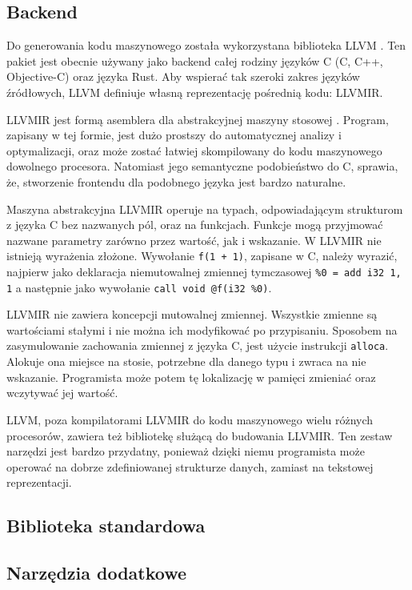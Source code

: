 \subsection{Backend}
\label{implementation:backend}
Do generowania kodu maszynowego została wykorzystana biblioteka LLVM \cite{Lattner:MSThesis02}.
Ten pakiet jest obecnie używany jako backend całej rodziny języków C (C, C++, Objective-C) oraz języka Rust.
Aby wspierać tak szeroki zakres języków źródłowych, LLVM definiuje własną reprezentację pośrednią kodu: LLVMIR.

LLVMIR jest formą asemblera dla abstrakcyjnej maszyny stosowej \cite{llvmir}.
Program, zapisany w tej formie, jest dużo prostszy do automatycznej analizy i optymalizacji, oraz może zostać łatwiej skompilowany do kodu maszynowego dowolnego procesora.
Natomiast jego semantyczne podobieństwo do C, sprawia, że, stworzenie frontendu dla podobnego języka jest bardzo naturalne.

Maszyna abstrakcyjna LLVMIR operuje na typach, odpowiadającym strukturom z języka C bez nazwanych pól, oraz na funkcjach.
Funkcje mogą przyjmować nazwane parametry zarówno przez wartość, jak i wskazanie.
W LLVMIR nie istnieją wyrażenia złożone.
Wywołanie \lstinline{f(1 + 1)}, zapisane w C, należy wyrazić, najpierw jako deklaracja niemutowalnej zmiennej tymczasowej \lstinline{%0 = add i32 1, 1} a następnie jako wywołanie \lstinline{call void @f(i32 %0)}.

LLVMIR nie zawiera koncepcji mutowalnej zmiennej.
Wszystkie zmienne są wartościami stałymi i nie można ich modyfikować po przypisaniu.
Sposobem na zasymulowanie zachowania zmiennej z języka C, jest użycie instrukcji \lstinline{alloca}.
Alokuje ona miejsce na stosie, potrzebne dla danego typu i zwraca na nie wskazanie.
Programista może potem tę lokalizację w pamięci zmieniać oraz wczytywać jej wartość.

LLVM, poza kompilatorami LLVMIR do kodu maszynowego wielu różnych procesorów, zawiera też bibliotekę służącą do budowania LLVMIR.
Ten zestaw narzędzi jest bardzo przydatny, ponieważ dzięki niemu programista może operować na dobrze zdefiniowanej strukturze danych, zamiast na tekstowej reprezentacji.

\subsection{Biblioteka standardowa}

\subsection{Narzędzia dodatkowe}

